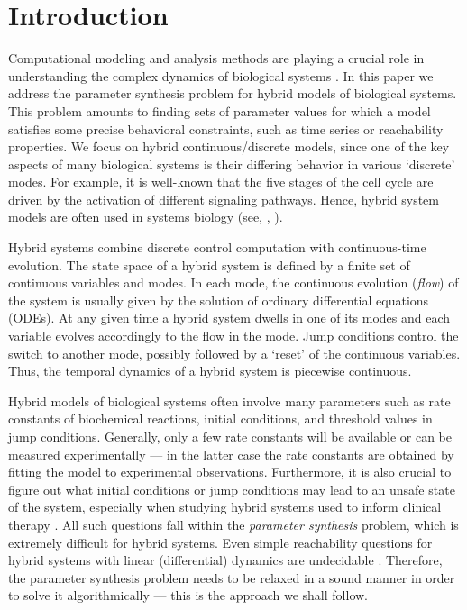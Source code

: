 \section{Introduction}

Computational modeling and analysis methods are playing a crucial role in understanding the complex dynamics of biological systems \citep{liu12jbcb}. In this paper we address the parameter synthesis problem for hybrid models of biological systems.
This problem amounts to finding sets of parameter values for which a model satisfies some precise 
behavioral constraints, such as time series or reachability properties. We focus on hybrid 
continuous/discrete models, since one of the key aspects of many biological systems is their differing 
behavior in various `discrete' modes. For example, it is well-known that the five stages of the cell 
cycle are driven by the activation of different signaling pathways. Hence, hybrid system models are often 
used in systems biology (see, \eg, 
\citep{chen04,tomlin04,Hu04,ye08,aihara10,antoniotti03,lincoln04,baldazzi11}).

Hybrid systems combine discrete control computation with continuous-time evolution. The state space 
of a hybrid system is defined by a finite set of continuous variables and modes. In each mode, the
continuous evolution ({\em flow}) of the system is usually given by the solution of ordinary differential
equations (ODEs). At any given time a hybrid system dwells in one of its modes and each variable 
evolves accordingly to the flow in the mode. Jump conditions control the switch to another mode,
possibly followed by a `reset' of the continuous variables. Thus, the temporal dynamics of a 
hybrid system is piecewise continuous.

Hybrid models of biological systems often involve many parameters such as rate constants of 
biochemical reactions, initial conditions, and threshold values in jump conditions. Generally, only 
a few rate constants will be available or can be measured experimentally --- in the latter case
the rate constants are obtained by fitting the model to experimental observations. Furthermore, 
it is also crucial to figure out what initial conditions or jump conditions may lead to an unsafe
state of the system, especially when studying hybrid systems used to inform clinical 
therapy \citep{tanaka10}. All such questions fall within the \textit{parameter synthesis} problem,
which is extremely difficult for hybrid systems. Even simple reachability questions for hybrid 
systems with linear (differential) dynamics are undecidable \citep{henzinger96}.
Therefore, the parameter synthesis problem needs to be relaxed in a sound manner in order to solve
it algorithmically --- this is the approach we shall follow.



